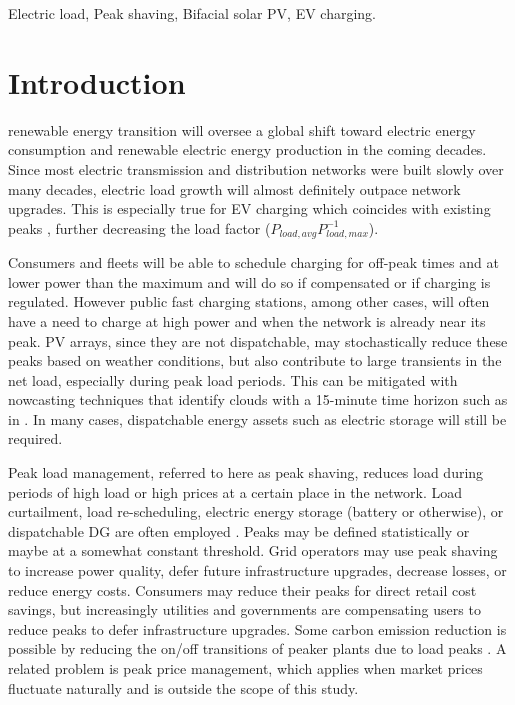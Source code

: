 \documentclass[conference]{IEEEtran}
\begin{document}
\begin{IEEEkeywords}
Electric load, Peak shaving, Bifacial solar PV, EV charging.
\end{IEEEkeywords}

\section{Introduction}


 renewable energy transition will oversee a global shift toward electric energy consumption and renewable electric energy production in the coming decades. Since most electric transmission and distribution networks were built slowly over many decades, electric load growth will almost definitely outpace network upgrades. This is especially true for EV charging which coincides with existing peaks  \cite{Bobmann2015}, further decreasing the load factor ($P_{load,avg} P_{load,max}^{-1}$).


Consumers and fleets will be able to schedule charging for off-peak times and at lower power than the maximum and will do so if compensated or if charging is regulated. However public fast charging stations, among other cases, will often have a need to charge at high power and when the network is already near its peak. PV arrays, since they are not dispatchable, may stochastically reduce these peaks based on weather conditions, but also contribute to large transients in the net load, especially during peak load periods. This can be mitigated with nowcasting techniques that identify clouds with a 15-minute time horizon such as in \cite{Nespoli2022}. In many cases, dispatchable energy assets such as electric storage will still be required.


Peak load management, referred to here as peak shaving, reduces load during periods of high load or high prices at a certain place in the network. Load curtailment, load re-scheduling, electric energy storage (battery or otherwise), or dispatchable DG are often employed \cite{Uddin2018}. Peaks may be defined statistically or maybe at a somewhat constant threshold. Grid operators may use peak shaving to increase power quality, defer future infrastructure upgrades, decrease losses, or reduce energy costs. Consumers may reduce their peaks for direct retail cost savings, but increasingly utilities and governments are compensating users to reduce peaks to defer infrastructure upgrades. Some carbon emission reduction is possible by reducing the on/off transitions of peaker plants due to load peaks \cite{Uddin2018}. A related problem is peak price management, which applies when market prices fluctuate naturally and is outside the scope of this study.
\end{document}

